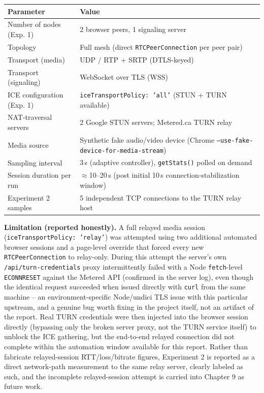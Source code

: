 \documentclass[12pt,a4paper]{report}
\begin{document}
\begin{center}
\begin{tabular}{ll}
\toprule
\textbf{Parameter} & \textbf{Value} \\
\midrule
Number of nodes (Exp. 1) & 2 browser peers, 1 signaling server \\
Topology & Full mesh (direct \texttt{RTCPeerConnection} per peer pair) \\
Transport (media) & UDP / RTP + SRTP (DTLS-keyed) \\
Transport (signaling) & WebSocket over TLS (WSS) \\
ICE configuration (Exp. 1) & \texttt{iceTransportPolicy: 'all'} (STUN + TURN available) \\
NAT-traversal servers & 2 Google STUN servers; Metered.ca TURN relay \\
Media source & Synthetic fake audio/video device (Chrome \texttt{--use-fake-device-for-media-stream}) \\
Sampling interval & 3\,s (adaptive controller), \texttt{getStats()} polled on demand \\
Session duration per run & $\approx$10--20\,s (post initial 10\,s connection-stabilization window) \\
Experiment 2 samples & 5 independent TCP connections to the TURN relay host \\
\bottomrule
\end{tabular}
\end{center}

\textbf{Limitation (reported honestly).} A full relayed media session
(\texttt{iceTransportPolicy: 'relay'}) was attempted using two additional automated
browser sessions and a page-level override that forced every new
\texttt{RTCPeerConnection} to relay-only. During this attempt the server's own
\texttt{/api/turn-credentials} proxy intermittently failed with a Node
\texttt{fetch}-level \texttt{ECONNRESET} against the Metered API (confirmed in the server
log), even though the identical request succeeded when issued directly with \texttt{curl}
from the same machine -- an environment-specific Node/undici TLS issue with this particular
upstream, and a genuine bug worth fixing in the project itself, not an artifact of the
report. Real TURN credentials were then injected into the browser session directly (bypassing
only the broken server proxy, not the TURN service itself) to unblock the ICE gathering, but
the end-to-end relayed connection did not complete within the automation window available for
this report. Rather than fabricate relayed-session RTT/loss/bitrate figures, Experiment 2 is
reported as a direct network-path measurement to the same relay server, clearly labeled as
such, and the incomplete relayed-session attempt is carried into Chapter 9 as future work.
\end{document}
